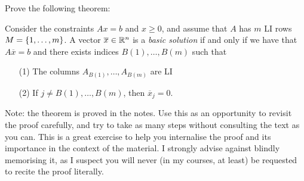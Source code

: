 
Prove the following theorem:

\begin{theorem*} 
	\small
	Consider the constraints $Ax = b$ and $x \geq 0$, and assume that $A$ has $m$ LI rows $M = \left\{ 1,\dots,m \right \}$. A vector $\overline{x} \in \mathbb{R}^n$ is a \emph{basic solution} if and only if we have that $A\overline{x} = b$ and there exists indices $B(1), \dots, B(m)$ such that
	\begin{enumerate}
		\item[(1)] The columns $A_{B(1)}, \dots, A_{B(m)}$ are LI
		\item[(2)] If $j \neq B(1), \dots, B(m)$, then $\overline{x}_j = 0$.
	\end{enumerate} 
\end{theorem*}

Note: the theorem is proved in the notes. Use this as an opportunity to revisit the proof carefully, and try to take as many steps without consulting the text as you can. This is a great exercise to help you internalise the proof and its importance in the context of the material. I strongly advise against blindly memorising it, as I suspect you will never (in my courses, at least) be requested to recite the proof literally.